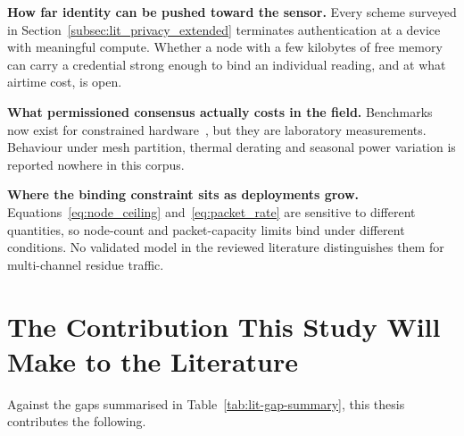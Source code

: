 \documentclass[12pt,a4paper,oneside]{book}
\begin{document}
\textbf{How far identity can be pushed toward the sensor.} Every scheme
surveyed in Section~\ref{subsec:lit_privacy_extended} terminates authentication
at a device with meaningful compute. Whether a node with a few kilobytes of
free memory can carry a credential strong enough to bind an individual reading,
and at what airtime cost, is open.

\textbf{What permissioned consensus actually costs in the
field.} Benchmarks now exist for constrained
hardware~\cite{zulkarnain2025performancebenchmarking,
pebriyanti2025evaluationscalability}, but they are laboratory measurements.
Behaviour under mesh partition, thermal derating and seasonal power variation
is reported nowhere in this corpus.

\textbf{Where the binding constraint sits as deployments grow.}
Equations~\ref{eq:node_ceiling} and~\ref{eq:packet_rate} are sensitive to
different quantities, so node-count and packet-capacity limits bind under
different conditions. No validated model in the reviewed literature
distinguishes them for multi-channel residue traffic.

\section{The Contribution This Study Will Make to the Literature}
\label{sec:lit_contribution}

Against the gaps summarised in Table~\ref{tab:lit-gap-summary}, this thesis
contributes the following.
\end{document}

